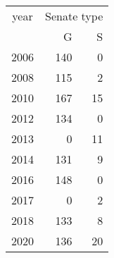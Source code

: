 \footnotesize\begin{tabular}[t]{lrr}
\toprule
\multicolumn{1}{c}{year} & \multicolumn{2}{c}{Senate type} \\
\cmidrule(l{3pt}r{3pt}){1-1} \cmidrule(l{3pt}r{3pt}){2-3}
  & G & S\\
\midrule
2006 & 140 & 0\\
2008 & 115 & 2\\
2010 & 167 & 15\\
2012 & 134 & 0\\
2013 & 0 & 11\\
2014 & 131 & 9\\
2016 & 148 & 0\\
2017 & 0 & 2\\
2018 & 133 & 8\\
2020 & 136 & 20\\
\bottomrule
\end{tabular}
